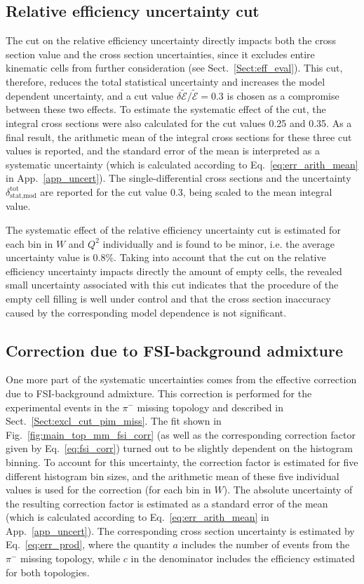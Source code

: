 \subsection*{Relative efficiency uncertainty cut}

The cut on the relative efficiency uncertainty directly impacts both the cross section value and the cross section uncertainties, since it excludes entire kinematic cells from further consideration (see Sect.~\ref{Sect:eff_eval}). This cut, therefore, reduces the total statistical uncertainty and increases the model dependent uncertainty, and a cut value $\delta \widetilde{\mathcal{E}}/\widetilde{\mathcal{E}} = 0.3$ is chosen as a compromise between these two effects. To estimate the systematic effect of the cut, the integral cross sections were also calculated for the cut values 0.25 and 0.35. As a final result, the arithmetic mean of the integral cross sections for these three cut values is reported, and the standard error of the mean is interpreted as a systematic uncertainty (which is calculated according to Eq.~\eqref{eq:err_arith_mean} in App.~\ref{app_uncert}). The single-differential cross sections and the uncertainty $\delta_{\text{stat,mod}}^{\text{tot}}$ are reported for the cut value 0.3, being scaled to the mean integral value.

The systematic effect of the relative efficiency uncertainty cut is estimated for each bin in $W$ and $Q^{2}$ individually and is found to be minor, i.e. the average uncertainty value is 0.8\%. Taking into account that the cut on the relative efficiency uncertainty impacts directly the amount of empty cells, the revealed small uncertainty associated with this cut indicates that the procedure of the empty cell filling is well under control and that the cross section inaccuracy caused by the corresponding model dependence is not significant. 


\subsection*{Correction due to FSI-background admixture}

One more part of the systematic uncertainties comes from the effective correction due to FSI-background admixture. This correction is performed for the experimental events in the $\pi^{-}$ missing topology and described in Sect.~\ref{Sect:excl_cut_pim_miss}. The fit shown in Fig.~\ref{fig:main_top_mm_fsi_corr} (as well as the corresponding correction factor given by Eq.~\eqref{eq:fsi_corr}) turned out to be slightly dependent on the histogram binning. To account for this uncertainty, the correction factor is estimated for five different histogram bin sizes, and the arithmetic mean of these five individual values is used for the correction (for each bin in $W$). The absolute uncertainty of the resulting correction factor is estimated as a standard error of the mean (which is calculated according to Eq.~\eqref{eq:err_arith_mean} in App.~\ref{app_uncert}). The corresponding cross section uncertainty is estimated by Eq.~\eqref{eq:err_prod}, where the quantity $a$ includes the number of events from the $\pi^{-}$ missing topology, while $c$ in the denominator includes the efficiency estimated for both topologies. 

